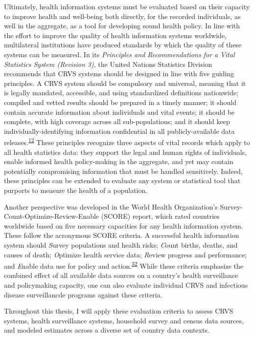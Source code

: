 \documentclass[
]{article}
\begin{document}
Ultimately, health information systems must be evaluated based on their capacity to improve health and well-being both directly, for the recorded individuals, as well in the aggregate, as a tool for developing sound health policy. In line with the effort to improve the quality of health information systems worldwide, multilateral institutions have produced standards by which the quality of these systems can be measured. In its \emph{Principles and Recommendations for a Vital Statistics System (Revision 3)}, the United Nations Statistics Division recommends that CRVS systems should be designed in line with five guiding principles. A CRVS system should be compulsory and universal, meaning that it is legally mandated, accessible, and using standardized definitions nationwide; compiled and vetted results should be prepared in a timely manner; it should contain accurate information about individuals and vital events; it should be complete, with high coverage across all sub-populations; and it should keep individually-identifying information confidential in all publicly-available data releases.\textsuperscript{\protect\hyperlink{ref-UnitedNationsStatisticsDivision2014}{12}} These principles recognize three aspects of vital records which apply to all health statistics data: they support the legal and human rights of individuals, enable informed health policy-making in the aggregate, and yet may contain potentially compromising information that must be handled sensitively. Indeed, these principles can be extended to evaluate any system or statistical tool that purports to measure the health of a population.

Another perspective was developed in the World Health Organization's Survey-Count-Optimize-Review-Enable (SCORE) report, which rated countries worldwide based on five necessary capacities for any health information system. These follow the acronymous SCORE criteria. A successful health information system should \emph{S}urvey populations and health risks; \emph{C}ount births, deaths, and causes of death; \emph{O}ptimize health service data; \emph{R}eview progress and performance; and \emph{E}nable data use for policy and action.\textsuperscript{\protect\hyperlink{ref-WorldHealthOrganization2021}{32}} While these criteria emphasize the combined effect of all available data sources on a country's health surveillance and policymaking capacity, one can also evaluate individual CRVS and infectious disease surveillancde programs against these criteria.

Throughout this thesis, I will apply these evaluation criteria to assess CRVS systems, health surveillance systems, household survey and census data sources, and modeled estimates across a diverse set of country data contexts.
\end{document}
